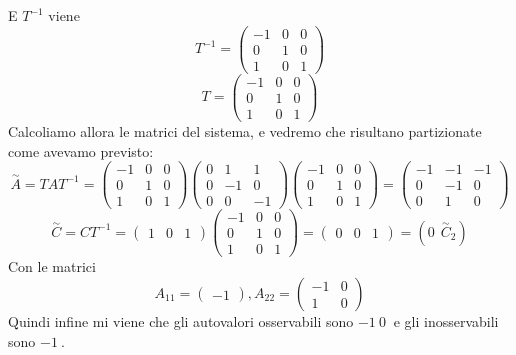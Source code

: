 \documentclass{article}
\begin{document}
E $T^{-1}$ viene \[ 
T^{-1} = \left(\begin{matrix}-1 & 0 & 0\\0 & 1 & 0\\1 & 0 & 1\end{matrix}\right) \]
\[ 
T = \left(\begin{matrix}-1 & 0 & 0\\0 & 1 & 0\\1 & 0 & 1\end{matrix}\right) \]Calcoliamo allora le matrici del sistema, e vedremo che risultano partizionate come avevamo previsto:
\[ 
\overset{\sim}{A} = T A  T^{-1} = \left(\begin{matrix}-1 & 0 & 0\\0 & 1 & 0\\1 & 0 & 1\end{matrix}\right)\left(\begin{matrix}0 & 1 & 1\\0 & -1 & 0\\0 & 0 & -1\end{matrix}\right)\left(\begin{matrix}-1 & 0 & 0\\0 & 1 & 0\\1 & 0 & 1\end{matrix}\right) = \left(\begin{matrix}-1 & -1 & -1\\0 & -1 & 0\\0 & 1 & 0\end{matrix}\right) \]
\[ 
\overset{\sim}{C} = CT^{-1} = \left(\begin{matrix}1 & 0 & 1\end{matrix}\right)\left(\begin{matrix}-1 & 0 & 0\\0 & 1 & 0\\1 & 0 & 1\end{matrix}\right) = \left(\begin{matrix}0 & 0 & 1\end{matrix}\right) = ( 0\ \ \overset{\sim}{C}_2) \]
Con le matrici \[ A_{11} = \left(\begin{matrix}-1\end{matrix}\right) , A_{22} = \left(\begin{matrix}-1 & 0\\1 & 0\end{matrix}\right) \]Quindi infine mi viene che gli autovalori osservabili sono $ -1\ 0\  $ e gli inosservabili sono $ -1\  $.
\end{document}
